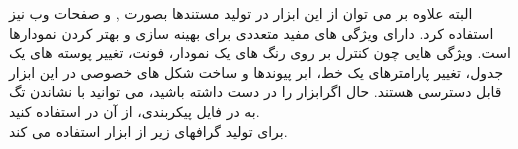 البته علاوه بر
 می توان از این ابزار در تولید مستندها بصورت
 ,  و صفحات وب نیز استفاده کرد.
 دارای ویژگی های مفید متعددی برای بهینه سازی و بهتر کردن نمودارها است. 
ویژگی هایی چون کنترل بر روی رنگ های یک نمودار، فونت، تغییر پوسته های یک جدول، تغییر پارامترهای یک خط، ابر پیوندها و ساخت شکل های خصوصی در این ابزار قابل دسترسی هستند.
\cite{graph}
حال اگرابزار را در دست داشته باشید، می توانید با نشاندن تگ 
  به  در فایل پیکربندی، از آن در  استفاده کنید.\\
 برای تولید گرافهای زیر از ابزار  استفاده می کند.\\



%
